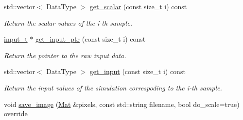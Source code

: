 \begin{DoxyCompactItemize}
std\+::vector$<$ Data\+Type $>$ \hyperlink{classlbann_1_1data__reader__jag_ad99fffc2f11cb6f3fc42ef1138a3f925}{get\+\_\+scalar} (const size\+\_\+t i) const
\begin{DoxyCompactList}\small\item\em Return the scalar values of the i-\/th sample. \end{DoxyCompactList}\item 
\hyperlink{classlbann_1_1data__reader__jag_ab08c9af4bca496b7889de1473c3d8d4e}{input\+\_\+t} $\ast$ \hyperlink{classlbann_1_1data__reader__jag_a5535a2dc025d484ac01a6aad8585c9b5}{get\+\_\+input\+\_\+ptr} (const size\+\_\+t i) const
\begin{DoxyCompactList}\small\item\em Return the pointer to the raw input data. \end{DoxyCompactList}\item 
std\+::vector$<$ Data\+Type $>$ \hyperlink{classlbann_1_1data__reader__jag_aef236213fa1b229a2554c494fabb8873}{get\+\_\+input} (const size\+\_\+t i) const
\begin{DoxyCompactList}\small\item\em Return the input values of the simulation correspoding to the i-\/th sample. \end{DoxyCompactList}\item 
void \hyperlink{classlbann_1_1data__reader__jag_a396e7456d926ae9045011e7f28284946}{save\+\_\+image} (\hyperlink{base_8hpp_a68f11fdc31b62516cb310831bbe54d73}{Mat} \&pixels, const std\+::string filename, bool do\+\_\+scale=true) override
\end{DoxyCompactItemize}

